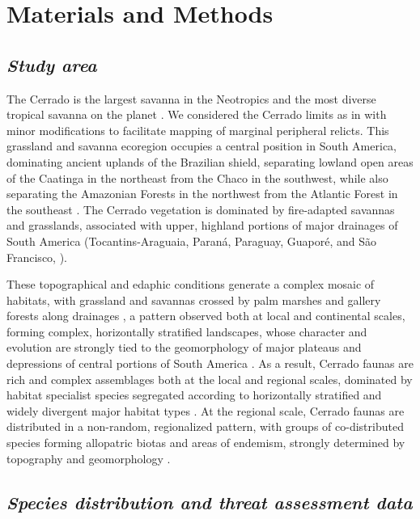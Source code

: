 \documentclass[12pt,openright,oneside,a4paper,english]{abntex2}
\begin{document}
\section{Materials and Methods}
\subsection{\textit{Study area}}

The Cerrado is the largest savanna in the Neotropics and the most diverse tropical savanna on the planet \citep{Ratter1997, KlinkMachado2005}. We considered the Cerrado limits as in \citet{Dinerstein2017} with minor modifications to facilitate mapping of marginal peripheral relicts. This grassland and savanna ecoregion occupies a central position in South America, dominating ancient uplands of the Brazilian shield, separating lowland open areas of the Caatinga in the northeast from the Chaco in the southwest, while also separating the Amazonian Forests in the northwest from the Atlantic Forest in the southeast \citep{Silva2002}. The Cerrado vegetation is dominated by fire-adapted savannas and grasslands, associated with upper, highland portions of major drainages of South America (Tocantins-Araguaia, Paraná, Paraguay, Guaporé, and São Francisco, \citealp{Absaber1998}). 

These topographical and edaphic conditions generate a complex mosaic of habitats, with grassland and savannas crossed by palm marshes and gallery forests along drainages \citep{Eiten1972, Ratter1997}, a pattern observed both at local and continental scales, forming complex, horizontally stratified landscapes, whose character and evolution are strongly tied to the geomorphology of major plateaus and depressions of central portions of South America \citep{Silva2002, Colli2020}. As a result, Cerrado faunas are rich and complex assemblages both at the local and regional scales, dominated by habitat specialist species segregated according to horizontally stratified and widely divergent major habitat types \citep{Silva1997, Silva2002, Nogueira2009, Carmignotto2022}. At the regional scale, Cerrado faunas are distributed in a non-random, regionalized pattern, with groups of co-distributed species forming allopatric biotas and areas of endemism, strongly determined by topography and geomorphology \citep{Silva2002, Nogueira2011, Valdujo2012, Azevedo2016}.

\subsection{\textit{Species distribution and threat assessment data}}
\end{document}

